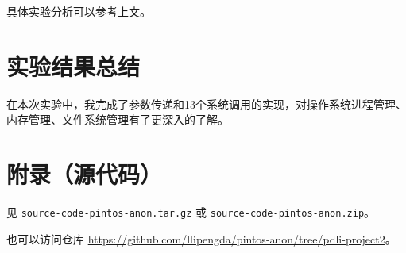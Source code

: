 \documentclass{article}
\begin{document}
具体实验分析可以参考上文。

\section{实验结果总结}

在本次实验中，我完成了参数传递和13个系统调用的实现，对操作系统进程管理、内存管理、文件系统管理有了更深入的了解。

\normalsize

\section{附录（源代码）}

见 \texttt{source-code-pintos-anon.tar.gz} 或 \texttt{source-code-pintos-anon.zip}。

也可以访问仓库 \url{https://github.com/llipengda/pintos-anon/tree/pdli-project2}。

\normalsize
\end{document}
